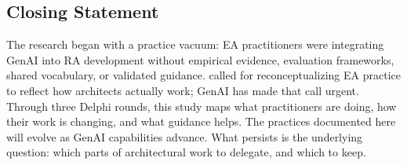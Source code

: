 \subsection{Closing Statement}\label{subsec:closing-statement}

The research began with a practice vacuum: EA practitioners were integrating
GenAI into RA development without empirical evidence, evaluation frameworks,
shared vocabulary, or validated guidance.
\textcite{kotusev_enterprise_2018} called for reconceptualizing EA practice to
reflect how architects actually work; GenAI has made that call urgent. Through
three Delphi rounds, this study maps what practitioners are doing, how their
work is changing, and what guidance helps. The practices documented here will
evolve as GenAI capabilities advance. What persists is the underlying question:
which parts of architectural work to delegate, and which to keep.
